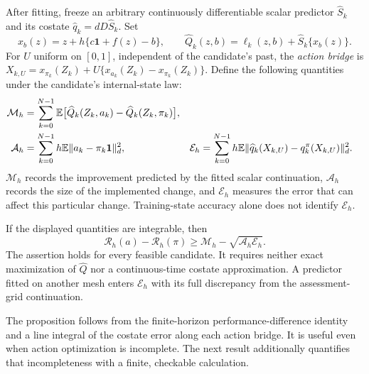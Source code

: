 After fitting, freeze an arbitrary continuously differentiable scalar
predictor $\widehat S_k$ and its costate $\widehat q_k=dD\widehat S_k$.
Set
\[
 x_b(z)=z+h\{c\bm1+f(z)-b\},\qquad
 \widehat Q_k(z,b)=\ell_k(z,b)+\widehat S_k\{x_b(z)\}.
\]
For $U$ uniform on $[0,1]$, independent of the candidate's past, the
\emph{action bridge} is
$X_{k,U}=x_{\pi_k}(Z_k)+U\{x_{a_k}(Z_k)-x_{\pi_k}(Z_k)\}$.
Define the following quantities under the candidate's internal-state law:
\begin{align}
 \mathcal M_h&=\sum_{k=0}^{N-1}\mathbb E\big[
       \widehat Q_k(Z_k,a_k)-\widehat Q_k(Z_k,\pi_k)\big],\notag\\
 \mathcal A_h&=\sum_{k=0}^{N-1}h\mathbb E\|a_k-\pi_k\bm1\|_d^2,
 &\mathcal E_h&=\sum_{k=0}^{N-1}h\mathbb E
       \|\widehat q_k(X_{k,U})-q_k^\pi(X_{k,U})\|_d^2.
 \label{eq:r15accounts}
\end{align}
$\mathcal M_h$ records the improvement predicted by the fitted scalar
continuation, $\mathcal A_h$ records the size of the implemented change,
and $\mathcal E_h$ measures the error that can affect this particular
change. Training-state accuracy alone does not identify $\mathcal E_h$.

\begin{proposition}
\label{prop:r15bellmanbridge}
If the displayed quantities are integrable, then
\begin{equation}
 \mathcal R_h(a)-\mathcal R_h(\pi)
       \geq\mathcal M_h-\sqrt{\mathcal A_h\mathcal E_h}.
 \label{eq:r15bridge}
\end{equation}
The assertion holds for every feasible candidate. It requires neither
exact maximization of $\widehat Q$ nor a continuous-time costate
approximation. A predictor fitted on another mesh enters
$\mathcal E_h$ with its full discrepancy from the assessment-grid
continuation.
\end{proposition}

The proposition follows from the finite-horizon performance-difference
identity and a line integral of the costate error along each action
bridge. It is useful even when action optimization is incomplete. The
next result additionally quantifies that incompleteness with a finite,
checkable calculation.

